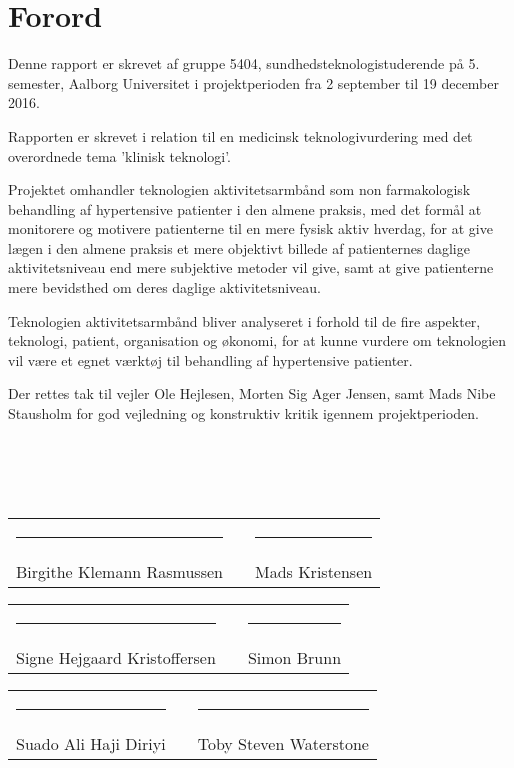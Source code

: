 \chapter*{Forord}

Denne rapport er skrevet af gruppe 5404, sundhedsteknologistuderende på 5. semester, Aalborg Universitet i projektperioden fra 2 september til 19 december 2016.

Rapporten er skrevet i relation til en medicinsk teknologivurdering med det overordnede tema 'klinisk teknologi'. 

Projektet omhandler teknologien aktivitetsarmbånd som non farmakologisk behandling af hypertensive patienter i den almene praksis, med det formål at monitorere og motivere patienterne til en mere fysisk aktiv hverdag, for at give lægen i den almene praksis et mere objektivt billede af patienternes daglige aktivitetsniveau end mere subjektive metoder vil give, samt at give patienterne mere bevidsthed om deres daglige aktivitetsniveau. 

Teknologien aktivitetsarmbånd bliver analyseret i forhold til de fire aspekter, teknologi, patient, organisation og økonomi, for at kunne vurdere om teknologien vil være et egnet værktøj til behandling af hypertensive patienter.

Der rettes tak til vejler Ole Hejlesen, Morten Sig Ager Jensen, samt Mads Nibe Stausholm for god vejledning og konstruktiv kritik igennem projektperioden. \\\\\\\\\\


\begin{tabular}{lcl}
   \hspace{-1cm} \rule{7cm}{0.5pt} & \hspace{1cm} & \rule{7cm}{0.5pt} \\
   \hspace{-1cm}  Birgithe Klemann Rasmussen&  & Mads Kristensen
\end{tabular}
\vspace{1.5cm}


\begin{tabular}{lcl}
   \hspace{-1cm} \rule{7cm}{0.5pt} & \hspace{1cm} & \rule{7cm}{0.5pt} \\
    \hspace{-1cm} Signe Hejgaard Kristoffersen & & Simon Brunn
\end{tabular}
\vspace{1.5cm}
      

\begin{tabular}{lcl}
    \hspace{-1cm} \rule{7cm}{0.5pt} & \hspace{1cm} & \rule{7cm}{0.5pt} \\
  \hspace{-1cm} Suado Ali Haji Diriyi & & Toby Steven Waterstone
\end{tabular}
\vspace{1.5cm}
    
\newpage
